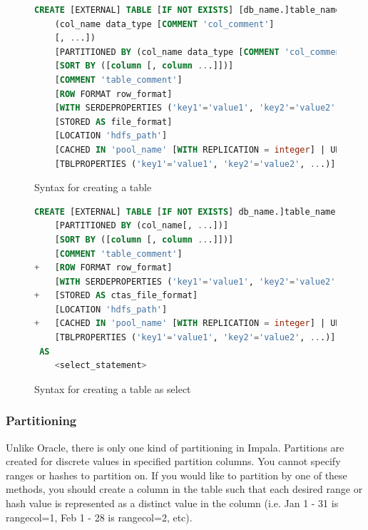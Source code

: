 \documentclass[onecolumn, draftclsnofoot,10pt, compsoc]{IEEEtran}
\begin{document}
\begin{figure}[ht]
    \begin{center}
        
    \begin{lstlisting}[language=SQL]
CREATE [EXTERNAL] TABLE [IF NOT EXISTS] [db_name.]table_name
    (col_name data_type [COMMENT 'col_comment'] 
    [, ...])
    [PARTITIONED BY (col_name data_type [COMMENT 'col_comment'], ...)]
    [SORT BY ([column [, column ...]])]
    [COMMENT 'table_comment']
    [ROW FORMAT row_format]
    [WITH SERDEPROPERTIES ('key1'='value1', 'key2'='value2', ...)]
    [STORED AS file_format]
    [LOCATION 'hdfs_path']
    [CACHED IN 'pool_name' [WITH REPLICATION = integer] | UNCACHED]
    [TBLPROPERTIES ('key1'='value1', 'key2'='value2', ...)]
\end{lstlisting}
    \caption{Syntax for creating a table}
    \end{center}

\end{figure}

\begin{figure}[ht]
    \begin{center}
    \begin{lstlisting}[language=SQL]
CREATE [EXTERNAL] TABLE [IF NOT EXISTS] db_name.]table_name
    [PARTITIONED BY (col_name[, ...])]
    [SORT BY ([column [, column ...]])]
    [COMMENT 'table_comment']
+   [ROW FORMAT row_format]
    [WITH SERDEPROPERTIES ('key1'='value1', 'key2'='value2', ...)]
+   [STORED AS ctas_file_format]
    [LOCATION 'hdfs_path']
+   [CACHED IN 'pool_name' [WITH REPLICATION = integer] | UNCACHED]
    [TBLPROPERTIES ('key1'='value1', 'key2'='value2', ...)]
 AS
    <select_statement>
\end{lstlisting}
    \caption{Syntax for creating a table as select}
    \end{center}
\end{figure}

        \subsubsection{Partitioning}
Unlike Oracle, there is only one kind of partitioning in Impala.
Partitions are created for discrete values in specified partition columns. 
You cannot specify ranges or hashes to partition on. 
If you would like to partition by one of these methods, you should create a column in the table such that each desired range or hash value is represented as a distinct value in the column (i.e. Jan 1 - 31 is rangecol=1, Feb 1 - 28 is rangecol=2, etc). 
\end{document}
